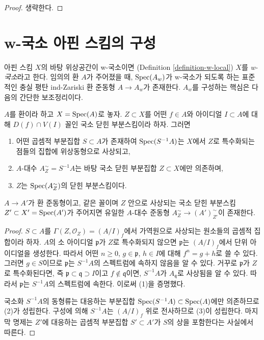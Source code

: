 \begin{proof}
생략한다.
\end{proof}







\section{w-국소 아핀 스킴의 구성}
\label{section-construction}

\noindent
아핀 스킴 $X$의 바탕 위상공간이 w-국소이면
(Definition \ref{definition-w-local}) $X$를 {\it w-국소}라고 한다.
임의의 환 $A$가 주어졌을 때, $\mathop{\mathrm{Spec}}(A_w)$가 w-국소가 되도록 하는
표준적인 충실 평탄 ind-Zariski 환 준동형 $A \to A_w$가 존재한다.
$A_w$를 구성하는 핵심은 다음의 간단한 보조정리이다.

\begin{lemma}
\label{lemma-localization}
$A$를 환이라 하고 $X = \mathop{\mathrm{Spec}}(A)$로 놓자.
$Z \subset X$를 어떤 $f \in A$와 아이디얼 $I \subset A$에 대해
$D(f) \cap V(I)$ 꼴인 국소 닫힌 부분스킴이라 하자. 그러면
\begin{enumerate}
\item 어떤 곱셈적 부분집합 $S \subset A$가 존재하여
$\mathop{\mathrm{Spec}}(S^{-1}A)$는 $X$에서 $Z$로 특수화되는 점들의 집합에
위상동형으로 사상되고,
\item $A$-대수 $A_Z^\sim = S^{-1}A$는 바탕 국소 닫힌 부분집합
$Z \subset X$에만 의존하며,
\item $Z$는 $\mathop{\mathrm{Spec}}(A_Z^\sim)$의 닫힌 부분스킴이다.
\end{enumerate}
$A \to A'$가 환 준동형이고, 같은 꼴이며 $Z$ 안으로 사상되는
국소 닫힌 부분스킴 $Z' \subset X' = \mathop{\mathrm{Spec}}(A')$가 주어지면
유일한 $A$-대수 준동형
$A_Z^\sim \to (A')_{Z'}^\sim$이 존재한다.
\end{lemma}

\begin{proof}
$S \subset A$를 $\Gamma(Z, \mathcal{O}_Z) = (A/I)_f$에서
가역원으로 사상되는 원소들의 곱셈적 집합이라 하자.
$A$의 소 아이디얼 $\mathfrak p$가 $Z$로 특수화되지 않으면
$\mathfrak p$는 $(A/I)_f$에서 단위 아이디얼을 생성한다.
따라서 어떤 $n \geq 0$, $g \in \mathfrak p$, $h \in I$에 대해
$f^n =  g + h$로 쓸 수 있다.
그러면 $g \in S$이므로 $\mathfrak p$는 $S^{-1}A$의 스펙트럼에
속하지 않음을 알 수 있다.
거꾸로 $\mathfrak p$가 $Z$로 특수화된다면, 즉
$\mathfrak p \subset \mathfrak q \supset I$이고
$f \not \in \mathfrak q$이면,
$S^{-1}A$가 $A_\mathfrak q$로 사상됨을 알 수 있다.
따라서 $\mathfrak p$는 $S^{-1}A$의 스펙트럼에 속한다.
이로써 (1)을 증명했다.

\medskip\noindent
국소화 $S^{-1}A$의 동형류는 대응하는 부분집합
$\mathop{\mathrm{Spec}}(S^{-1}A) \subset \mathop{\mathrm{Spec}}(A)$에만 의존하므로 (2)가 성립한다.
구성에 의해 $S^{-1}A$는 $(A/I)_f$ 위로 전사하므로 (3)이 성립한다.
마지막 명제는 $Z'$에 대응하는 곱셈적 부분집합 $S' \subset A'$가
$S$의 상을 포함한다는 사실에서 따른다.
\end{proof}


